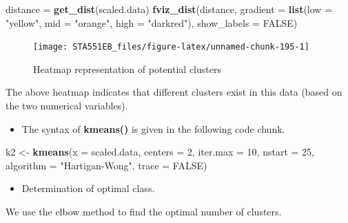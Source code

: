 \documentclass[
]{book}
\newenvironment{Shaded}{\begin{snugshade}}{\end{snugshade}}
\newcommand{\AttributeTok}[1]{\textcolor[rgb]{0.13,0.29,0.53}{#1}}
\newcommand{\ConstantTok}[1]{\textcolor[rgb]{0.56,0.35,0.01}{#1}}
\newcommand{\DecValTok}[1]{\textcolor[rgb]{0.00,0.00,0.81}{#1}}
\newcommand{\FunctionTok}[1]{\textcolor[rgb]{0.13,0.29,0.53}{\textbf{#1}}}
\newcommand{\NormalTok}[1]{#1}
\newcommand{\OtherTok}[1]{\textcolor[rgb]{0.56,0.35,0.01}{#1}}
\newcommand{\StringTok}[1]{\textcolor[rgb]{0.31,0.60,0.02}{#1}}
\providecommand{\tightlist}{%
  \setlength{\itemsep}{0pt}\setlength{\parskip}{0pt}}
\begin{document}
\begin{Shaded}
\begin{Highlighting}[]
\NormalTok{distance }\OtherTok{=} \FunctionTok{get\_dist}\NormalTok{(scaled.data)}
\FunctionTok{fviz\_dist}\NormalTok{(distance, }\AttributeTok{gradient =} \FunctionTok{list}\NormalTok{(}\AttributeTok{low =} \StringTok{"yellow"}\NormalTok{, }\AttributeTok{mid =} \StringTok{"orange"}\NormalTok{, }\AttributeTok{high =} \StringTok{"darkred"}\NormalTok{), }\AttributeTok{show\_labels =} \ConstantTok{FALSE}\NormalTok{)}
\end{Highlighting}
\end{Shaded}

\begin{figure}

{\centering \texttt{[image: STA551EB\_files/figure-latex/unnamed-chunk-195-1]} 

}

\caption{Heatmap representation of potential clusters}\label{fig:unnamed-chunk-195}
\end{figure}

The above heatmap indicates that different clusters exist in this data (based on the two numerical variables).

\begin{itemize}
\tightlist
\item
  The syntax of \textbf{kmeans()} is given in the following code chunk.
\end{itemize}

\begin{Shaded}
\begin{Highlighting}[]
\NormalTok{k2 }\OtherTok{\textless{}{-}} \FunctionTok{kmeans}\NormalTok{(}\AttributeTok{x =}\NormalTok{ scaled.data, }
             \AttributeTok{centers =} \DecValTok{2}\NormalTok{, }
             \AttributeTok{iter.max =} \DecValTok{10}\NormalTok{,}
             \AttributeTok{nstart =} \DecValTok{25}\NormalTok{,}
             \AttributeTok{algorithm =} \StringTok{"Hartigan{-}Wong"}\NormalTok{,}
             \AttributeTok{trace =} \ConstantTok{FALSE}\NormalTok{)}
\end{Highlighting}
\end{Shaded}

\begin{itemize}
\tightlist
\item
  Determination of optimal class.
\end{itemize}

We use the elbow method to find the optimal number of clusters.
\end{document}
